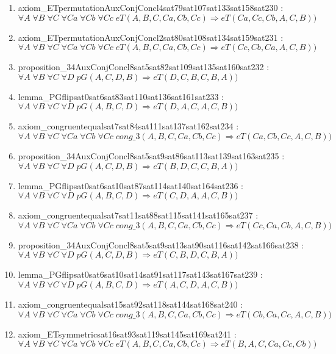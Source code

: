 \documentclass{article}
\begin{document}
\begin{enumerate}
\item axiom\_ETpermutationAuxConjConcl4sat79sat107sat133sat158sat230 : $\forall A\;\forall B\;\forall C\;\forall Ca\;\forall Cb\;\forall Cc\;eT(A, B, C, Ca, Cb, Cc) \Rightarrow eT(Ca, Cc, Cb, A, C, B))$
\item axiom\_ETpermutationAuxConjConcl2sat80sat108sat134sat159sat231 : $\forall A\;\forall B\;\forall C\;\forall Ca\;\forall Cb\;\forall Cc\;eT(A, B, C, Ca, Cb, Cc) \Rightarrow eT(Cc, Cb, Ca, A, C, B))$
\item proposition\_34AuxConjConcl8sat5sat82sat109sat135sat160sat232 : $\forall A\;\forall B\;\forall C\;\forall D\;pG(A, C, D, B) \Rightarrow eT(D, C, B, C, B, A))$
\item lemma\_PGflipsat0sat6sat83sat110sat136sat161sat233 : $\forall A\;\forall B\;\forall C\;\forall D\;pG(A, B, C, D) \Rightarrow eT(D, A, C, A, C, B))$
\item axiom\_congruentequalsat7sat84sat111sat137sat162sat234 : $\forall A\;\forall B\;\forall C\;\forall Ca\;\forall Cb\;\forall Cc\;cong\_3(A, B, C, Ca, Cb, Cc) \Rightarrow eT(Ca, Cb, Cc, A, C, B))$
\item proposition\_34AuxConjConcl8sat5sat9sat86sat113sat139sat163sat235 : $\forall A\;\forall B\;\forall C\;\forall D\;pG(A, C, D, B) \Rightarrow eT(B, D, C, C, B, A))$
\item lemma\_PGflipsat0sat6sat10sat87sat114sat140sat164sat236 : $\forall A\;\forall B\;\forall C\;\forall D\;pG(A, B, C, D) \Rightarrow eT(C, D, A, A, C, B))$
\item axiom\_congruentequalsat7sat11sat88sat115sat141sat165sat237 : $\forall A\;\forall B\;\forall C\;\forall Ca\;\forall Cb\;\forall Cc\;cong\_3(A, B, C, Ca, Cb, Cc) \Rightarrow eT(Cc, Ca, Cb, A, C, B))$
\item proposition\_34AuxConjConcl8sat5sat9sat13sat90sat116sat142sat166sat238 : $\forall A\;\forall B\;\forall C\;\forall D\;pG(A, C, D, B) \Rightarrow eT(C, B, D, C, B, A))$
\item lemma\_PGflipsat0sat6sat10sat14sat91sat117sat143sat167sat239 : $\forall A\;\forall B\;\forall C\;\forall D\;pG(A, B, C, D) \Rightarrow eT(A, C, D, A, C, B))$
\item axiom\_congruentequalsat15sat92sat118sat144sat168sat240 : $\forall A\;\forall B\;\forall C\;\forall Ca\;\forall Cb\;\forall Cc\;cong\_3(A, B, C, Ca, Cb, Cc) \Rightarrow eT(Cb, Ca, Cc, A, C, B))$
\item axiom\_ETsymmetricsat16sat93sat119sat145sat169sat241 : $\forall A\;\forall B\;\forall C\;\forall Ca\;\forall Cb\;\forall Cc\;eT(A, B, C, Ca, Cb, Cc) \Rightarrow eT(B, A, C, Ca, Cc, Cb))$

\end{enumerate}
\end{document}
